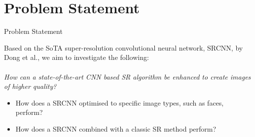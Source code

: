 \section{Problem Statement}
\begin{frame}{Problem Statement}{}


    \begin{block}{}

        Based on the SoTA super-resolution convolutional neural network, SRCNN, by Dong et al., we aim to investigate the following:\\
        ~\\


        \textit{How can a state-of-the-art CNN based SR algorithm be enhanced to create images of higher quality?}
        \begin{itemize}
            \item How does a SRCNN optimised to specific image types, such as faces, perform?
            \item How does a SRCNN combined with a classic SR method perform?
        \end{itemize}


    \end{block}
\end{frame}



